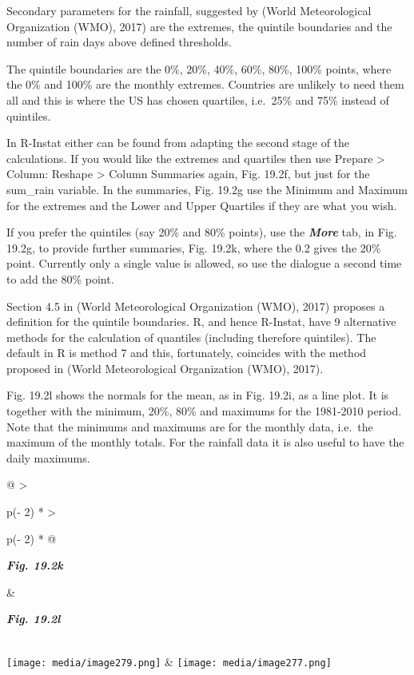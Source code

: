 \documentclass[
  letterpaper,
  DIV=11,
  numbers=noendperiod]{scrreprt}
\begin{document}
Secondary parameters for the rainfall, suggested by (World
Meteorological Organization (WMO), 2017) are the extremes, the quintile
boundaries and the number of rain days above defined thresholds.

The quintile boundaries are the 0\%, 20\%, 40\%, 60\%, 80\%, 100\%
points, where the 0\% and 100\% are the monthly extremes. Countries are
unlikely to need them all and this is where the US has chosen quartiles,
i.e.~25\% and 75\% instead of quintiles.

In R-Instat either can be found from adapting the second stage of the
calculations. If you would like the extremes and quartiles then use
Prepare \textgreater{} Column: Reshape \textgreater{} Column Summaries
again, Fig. 19.2f, but just for the sum\_rain variable. In the
summaries, Fig. 19.2g use the Minimum and Maximum for the extremes and
the Lower and Upper Quartiles if they are what you wish.

If you prefer the quintiles (say 20\% and 80\% points), use the
\textbf{\emph{More}} tab, in Fig. 19.2g, to provide further summaries,
Fig. 19.2k, where the 0.2 gives the 20\% point. Currently only a single
value is allowed, so use the dialogue a second time to add the 80\%
point.

Section 4.5 in (World Meteorological Organization (WMO), 2017) proposes
a definition for the quintile boundaries. R, and hence R-Instat, have 9
alternative methods for the calculation of quantiles (including
therefore quintiles). The default in R is method 7 and this,
fortunately, coincides with the method proposed in (World Meteorological
Organization (WMO), 2017).

Fig. 19.2l shows the normals for the mean, as in Fig. 19.2i, as a line
plot. It is together with the minimum, 20\%, 80\% and maximums for the
1981-2010 period. Note that the minimums and maximums are for the
monthly data, i.e.~the maximum of the monthly totals. For the rainfall
data it is also useful to have the daily maximums.

\begin{longtable}[]{@{}
  >{\raggedright\arraybackslash}p{(\columnwidth - 2\tabcolsep) * }
  >{\raggedright\arraybackslash}p{(\columnwidth - 2\tabcolsep) * }@{}}
\toprule\noalign{}
\begin{minipage}[b]{\linewidth}\raggedright
\textbf{\emph{Fig. 19.2k}}
\end{minipage} & \begin{minipage}[b]{\linewidth}\raggedright
\textbf{\emph{Fig. 19.2l}}
\end{minipage} \\
\midrule\noalign{}
\endhead
\bottomrule\noalign{}
\endlastfoot
\texttt{[image: media/image279.png]} &
\texttt{[image: media/image277.png]} \\
\end{longtable}
\end{document}
